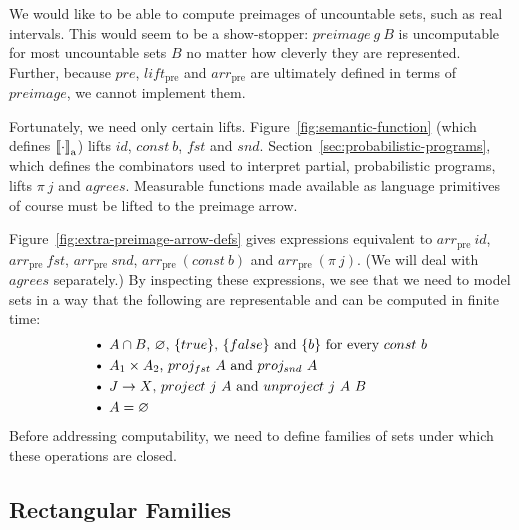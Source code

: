 \documentclass[preprint]{sigplanconf}
\newcommand{\arrowlift}{\ensuremath{lift}}
\newcommand{\arrowarr}{\ensuremath{arr}}
\newcommand{\gen}{_\mathrm{a}}
\newcommand{\pre}{_\mathrm{pre}}
\newcommand{\liftpre}{\arrowlift\pre}
\newcommand{\arrpre}{\arrowarr\pre}
\begin{document}
We would like to be able to compute preimages of uncountable sets, such as real intervals.
This would seem to be a show-stopper: $preimage~g~B$ is uncomputable for most uncountable sets $B$ no matter how cleverly they are represented.
Further, because $pre$, $\liftpre$ and $\arrpre$ are ultimately defined in terms of $preimage$, we cannot implement them.

Fortunately, we need only certain lifts.
Figure~\ref{fig:semantic-function} (which defines $\meaningof{\cdot}\gen$) lifts $id$, $const~b$, $fst$ and $snd$.
Section~\ref{sec:probabilistic-programs}, which defines the combinators used to interpret partial, probabilistic programs, lifts $\pi~j$ and $agrees$.
Measurable functions made available as language primitives of course must be lifted to the preimage arrow.

Figure~\ref{fig:extra-preimage-arrow-defs} gives expressions equivalent to $\arrpre~id$, $\arrpre~fst$, $\arrpre~snd$, $\arrpre~(const~b)$ and $\arrpre~(\pi~j)$.
(We will deal with $agrees$ separately.)
By inspecting these expressions, we see that we need to model sets in a way that
the following are representable and can be computed in finite time:
\begin{equation}
\begin{aligned}
	&\text{\textbullet\ $A \i B$, $\emptyset$, $\set{true}$, $\set{false}$ and $\set{b}$ for every $const~b$} \\
	&\text{\textbullet\ $A_1 \times A_2$, $proj_{fst}~A$ and $proj_{snd}~A$} \\
	&\text{\textbullet\ $J \to X$, $project~j~A$ and $unproject~j~A~B$} \\
	&\text{\textbullet\ $A = \emptyset$} \\
\end{aligned}
\label{eqn:exact-rectangle-ops}
\end{equation}
Before addressing computability, we need to define families of sets under which these operations are closed.

\subsection{Rectangular Families}
\end{document}
